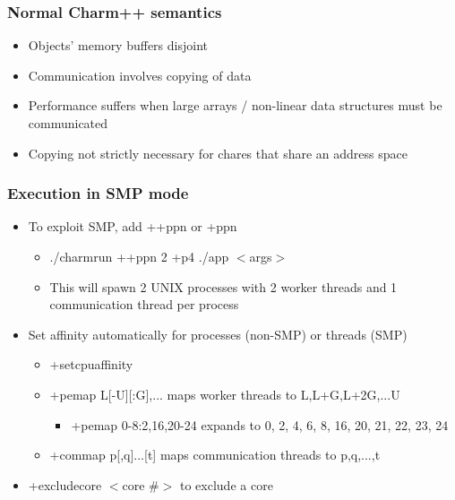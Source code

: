 
\begin{frame}[fragile]
  \frametitle{Normal Charm++ semantics}
  \begin{itemize}
    \item Objects' memory buffers disjoint
    \item Communication involves copying of data
    \item Performance suffers when large arrays / non-linear data structures must be communicated
    \item Copying not strictly necessary for chares that share an address space
  \end{itemize}
\end{frame}

\begin{frame}[fragile]
  \frametitle{Execution in SMP mode}
    \begin{itemize}
      \item To exploit SMP, add ++ppn or +ppn
      \begin{itemize}
        \item ./charmrun ++ppn 2 +p4 ./app $<$args$>$
        \item This will spawn 2 UNIX processes with 2 worker threads and 1 communication thread per process
      \end{itemize}
      \item Set affinity automatically for processes (non-SMP) or threads (SMP)
      \begin{itemize}
        \item +setcpuaffinity
        \item +pemap L[-U][:G],... maps worker threads to L,L+G,L+2G,...U
        \begin{itemize}
          \item +pemap 0-8:2,16,20-24 expands to 0, 2, 4, 6, 8, 16, 20, 21, 22, 23, 24
        \end{itemize}
        \item +commap p[,q]...[t] maps communication threads to p,q,...,t
      \end{itemize}
      \item +excludecore $<$core \#$>$ to exclude a core
    \end{itemize}
\end{frame}

